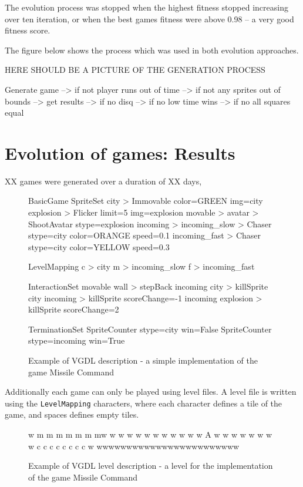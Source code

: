 \documentclass[a4paper,titlepage,final]{report}
\begin{document}
The evolution process was stopped when the highest fitness stopped increasing over ten iteration, or when the best games fitness were above 0.98 -- a very good fitness score.

The figure below shows the process which was used in both evolution approaches.

HERE SHOULD BE A PICTURE OF THE GENERATION PROCESS


Generate game --> if not player runs out of time --> if not any sprites out of bounds --> get results --> if no disq --> if no low time wins --> if no all squares equal


\section{Evolution of games: Results}
\label{sec_task2evolvingGames}
XX games were generated over a duration of XX days, 


\begin{figure}[!ht]
\centering
\begin{vgdldesc}[linewidth=14cm]
BasicGame
	SpriteSet
		city  > Immovable color=GREEN img=city
		explosion > Flicker limit=5 img=explosion
		movable >
			avatar  > ShootAvatar stype=explosion
			incoming >
				incoming_slow  > Chaser stype=city color=ORANGE speed=0.1
				incoming_fast  > Chaser stype=city color=YELLOW speed=0.3

	LevelMapping
		c > city
		m > incoming_slow
		f > incoming_fast
		
	InteractionSet
		movable wall  > stepBack
		incoming city > killSprite
		city incoming > killSprite scoreChange=-1
		incoming explosion > killSprite scoreChange=2

	TerminationSet
		SpriteCounter stype=city   win=False
		SpriteCounter stype=incoming win=True
\end{vgdldesc}
\caption{Example of VGDL description - a simple implementation of the game Missile Command}
\label{fig:vgdlgame}
\end{figure}

Additionally each game can only be played using level files. 
A level file is written using the \texttt{LevelMapping} characters, where each character defines a tile of the game, and spaces defines empty tiles.

\begin{figure}[!ht]
\centering
\begin{vgdldesc}[linewidth=14cm]
w    m  m   m  m  m m mw
w                      w
w                      w
w                      w
w                      w
w                      w
w           A          w
w                      w
w                      w
w                      w
w   c c c c c c c c    w
wwwwwwwwwwwwwwwwwwwwwwww
\end{vgdldesc}
\caption{Example of VGDL level description - a level for the implementation of the game Missile Command}
\label{fig:vgdlgame_level}
\end{figure}
\end{document}
